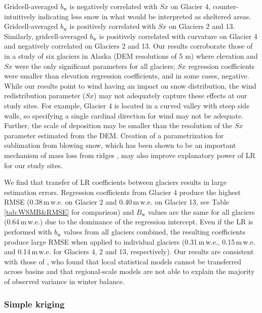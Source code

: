 \documentclass[twocolumn, letterpaper]{igs}
\begin{document}
Gridcell-averaged $b_\mathrm{w}$ is negatively correlated with $Sx$ on Glacier 4, counter-intuitively indicating less snow in what would be interpreted as sheltered areas. Gridcell-averaged $b_\mathrm{w}$ is positively correlated with $Sx$ on Glaciers 2 and 13. Similarly, gridcell-averaged $b_\mathrm{w}$ is positively correlated with curvature on Glacier 4 and negatively correlated on Glaciers 2 and 13. Our results corroborate those of \cite{McGrath2015} in a study of six glaciers in Alaska (DEM resolutions of 5 m) where elevation and $Sx$ were the only significant parameters for all glaciers; $Sx$ regression coefficients were smaller than elevation regression coefficients, and in some cases, negative. While our results point to wind having an impact on snow distribution, the wind redistribution parameter ($Sx$) may not adequately capture these effects at our study sites. For example, Glacier 4 is located in a curved valley with steep side walls, so specifying a single cardinal direction for wind may not be adequate. Further, the scale of deposition may be smaller than the resolution of the $Sx$ parameter estimated from the DEM. Creation of a parametrization for sublimation from blowing snow, which has been shown to be an important mechanism of mass loss from ridges \citep[e.g.][]{Musselman2015}, may also improve explanatory power of LR for our study sites.

We find that transfer of LR coefficients between glaciers results in large estimation errors. Regression coefficients from Glacier 4 produce the highest RMSE (0.38\,m\,w.e. on Glacier 2 and 0.40\,m\,w.e. on Glacier 13, see Table \ref{tab:WSMB&RMSE} for comparison) and $B_\mathrm{w}$ values are the same for all glaciers (0.64\,m\,w.e.) due to the dominance of the regression intercept. Even if the LR is performed with $b_\mathrm{w}$ values from all glaciers combined, the resulting coefficients produce large RMSE when applied to  individual glaciers (0.31\,m\,w.e., 0.15\,m\,w.e. and 0.14\,m\,w.e. for Glaciers 4, 2 and 13, respectively). Our results are consistent with those of \cite{Grunewald2013}, who found that local statistical models cannot be transferred across basins and that regional-scale models are not able to explain the majority of observed variance in winter balance. 

\subsubsection{Simple kriging}
\end{document}

